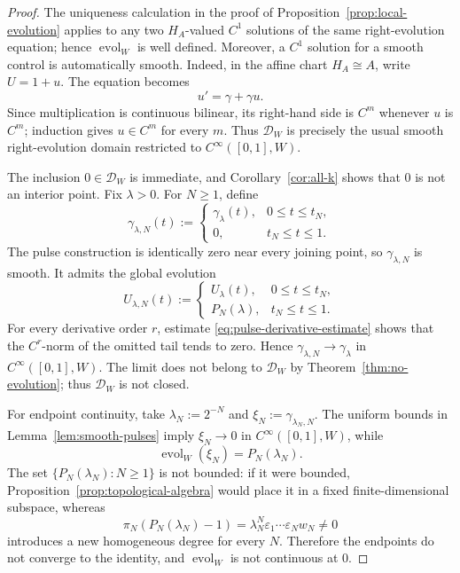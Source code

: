 \documentclass[11pt]{article}
\theoremstyle{remark}
\begin{document}
\begin{proof}
The uniqueness calculation in the proof of
Proposition~\ref{prop:local-evolution} applies to any two $H_A$-valued
$C^1$ solutions of the same right-evolution equation; hence
$\operatorname{evol}_W$ is well defined.  Moreover, a $C^1$ solution for a
smooth control is automatically smooth.  Indeed, in the affine chart
$H_A\cong A$, write $U=1+u$.  The equation becomes
\[
  u'=\gamma+\gamma u.
\]
Since multiplication is continuous bilinear, its right-hand side is $C^m$
whenever $u$ is $C^m$; induction gives $u\in C^m$ for every $m$.
Thus $\mathcal D_W$ is precisely the usual smooth right-evolution domain
restricted to $C^\infty([0,1],W)$.

The inclusion $0\in\mathcal D_W$ is immediate, and
Corollary~\ref{cor:all-k} shows that $0$ is not an interior point.  Fix
$\lambda>0$.  For $N\geq1$, define
\[
  \gamma_{\lambda,N}(t):=
  \begin{cases}
    \gamma_\lambda(t),&0\leq t\leq t_N,\\
    0,&t_N\leq t\leq1.
  \end{cases}
\]
The pulse construction is identically zero near every joining point, so
$\gamma_{\lambda,N}$ is smooth.  It admits the global evolution
\[
  U_{\lambda,N}(t):=
  \begin{cases}
    U_\lambda(t),&0\leq t\leq t_N,\\
    P_N(\lambda),&t_N\leq t\leq1.
  \end{cases}
\]
For every derivative order $r$, estimate
\eqref{eq:pulse-derivative-estimate} shows that the $C^r$-norm of the omitted
tail tends to zero.  Hence
$\gamma_{\lambda,N}\to\gamma_\lambda$ in
$C^\infty([0,1],W)$.  The limit does not belong to $\mathcal D_W$ by
Theorem~\ref{thm:no-evolution}; thus $\mathcal D_W$ is not closed.

For endpoint continuity, take $\lambda_N:=2^{-N}$ and
$\xi_N:=\gamma_{\lambda_N,N}$.  The uniform bounds in
Lemma~\ref{lem:smooth-pulses} imply $\xi_N\to0$ in
$C^\infty([0,1],W)$, while
\[
  \operatorname{evol}_W(\xi_N)=P_N(\lambda_N).
\]
The set $\{P_N(\lambda_N):N\geq1\}$ is not bounded: if it were bounded,
Proposition~\ref{prop:topological-algebra} would place it in a fixed
finite-dimensional subspace, whereas
\[
  \pi_N(P_N(\lambda_N)-1)
  =\lambda_N^N\varepsilon_1\cdots\varepsilon_Nw_N\neq0
\]
introduces a new homogeneous degree for every $N$.  Therefore the endpoints
do not converge to the identity, and $\operatorname{evol}_W$ is not
continuous at $0$.
\end{proof}
\end{document}
